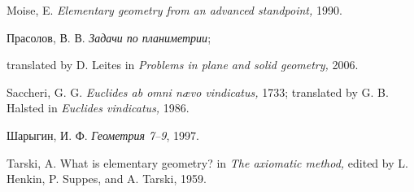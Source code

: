 \begin{thebibliography}{52}
Moise, E.
\textit{Elementary geometry from an advanced standpoint,}  
1990.

\begin{otherlanguage}{russian}
Прасолов, В. В. \textit{Задачи по планиметрии};
\end{otherlanguage}
translated by D. Leites in
\textit{Problems in plane and solid geometry,} 
 2006.

Saccheri, G. G.
\textit{Euclides ab omni n\ae vo vindicatus,} 
1733; translated by G. B. Halsted in \textit{Euclides vindicatus,} 1986.


\begin{otherlanguage}{russian}
Шарыгин, И. Ф.
\textit{Геометрия 7--9}, %
1997.
\end{otherlanguage}

 Tarski, A.
What is elementary geometry? in
\textit{The axiomatic method,} edited by L. Henkin, P. Suppes, and A. Tarski,
1959.



\end{thebibliography}
